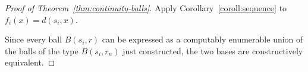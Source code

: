 \begin{proof}[Proof of Theorem~\protect\ref{thm:continuity-balls}]
  \notready
Apply Corollary~\ref{coroll:sequence} to \( f_i(x)=d(s_i,x) \).

Since every ball \( B(s_{i},r) \) can be expressed as a computably enumerable union of the balls
of the type \( B(s_{i},r_{n}) \) just constructed, the two bases are constructively
equivalent. 
\end{proof}
